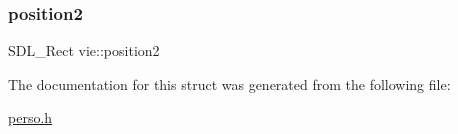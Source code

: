 \mbox{\label{structvie_a564dc9c3b28da24d81318d703ebc4e59}} 
\subsubsection{\texorpdfstring{position2}{position2}}
{\footnotesize\ttfamily S\+D\+L\+\_\+\+Rect vie\+::position2}



The documentation for this struct was generated from the following file\+:\begin{DoxyCompactItemize}
\item 
\hyperlink{perso_8h}{perso.\+h}\end{DoxyCompactItemize}
